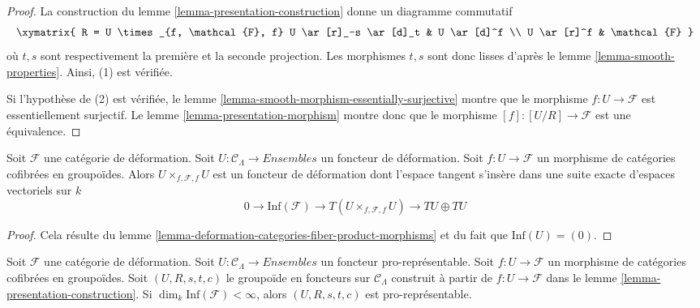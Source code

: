 \begin{proof}
La construction du lemme \ref{lemma-presentation-construction} donne un
diagramme commutatif
$$
\xymatrix{
R = U \times_{f, \mathcal{F}, f} U \ar[r]_-s \ar[d]_t & U
\ar[d]^f \\
U \ar[r]^f & \mathcal{F}
}
$$
où $t, s$ sont respectivement la première et la seconde projection. Les morphismes $t, s$
sont donc lisses d'après le lemme \ref{lemma-smooth-properties}. Ainsi, (1)
est vérifiée.

\medskip\noindent
Si l'hypothèse de (2) est vérifiée, le lemme
\ref{lemma-smooth-morphism-essentially-surjective} montre que le morphisme
$f : U \to \mathcal{F}$ est essentiellement surjectif. Le lemme
\ref{lemma-presentation-morphism} montre donc que le morphisme
$[f] : [U/R] \to \mathcal{F}$ est une équivalence.
\end{proof}

\begin{lemma}
\label{lemma-deformation-functor-diagonal}
Soit $\mathcal{F}$ une catégorie de déformation. Soit
$U : \mathcal{C}_\Lambda \to \textit{Ensembles}$ un foncteur de déformation. Soit
$f: U \to \mathcal{F}$ un morphisme de catégories cofibrées en groupoïdes.
Alors $U \times_{f, \mathcal{F}, f} U$ est un foncteur de déformation dont
l'espace tangent s'insère dans une suite exacte d'espaces vectoriels sur $k$
$$
0 \to \text{Inf}(\mathcal{F}) \to
T(U \times_{f, \mathcal{F}, f} U) \to TU \oplus TU
$$
\end{lemma}

\begin{proof}
Cela résulte du lemme
\ref{lemma-deformation-categories-fiber-product-morphisms} et du fait que
$\text{Inf}(U) = (0)$.
\end{proof}

\begin{lemma}
\label{lemma-prorepresentable-groupoid-in-functors-construction}
Soit $\mathcal{F}$ une catégorie de déformation. Soit
$U : \mathcal{C}_\Lambda \to \textit{Ensembles}$ un foncteur pro-représentable.
Soit $f : U \to \mathcal{F}$ un morphisme de catégories cofibrées en
groupoïdes. Soit $(U, R, s, t, c)$ le groupoïde en foncteurs sur
$\mathcal{C}_\Lambda$ construit à partir de $f : U \to \mathcal{F}$ dans le
lemme \ref{lemma-presentation-construction}. Si
$\dim_k \text{Inf}(\mathcal{F}) < \infty$, alors $(U, R, s, t, c)$ est
pro-représentable.
\end{lemma}

